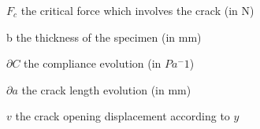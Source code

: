 \documentclass[3p,times,procedia]{elsarticle}
\begin{document}
$F_c$ the critical force which involves the crack (in \si{\newton})

b the thickness of the specimen (in \si{\milli\meter})

$\partial C$ the compliance evolution (in $Pa^-1$)

$\partial a$ the crack length evolution (in \si{\milli\meter})

$v$ the crack opening displacement according to $y$



\end{document}
